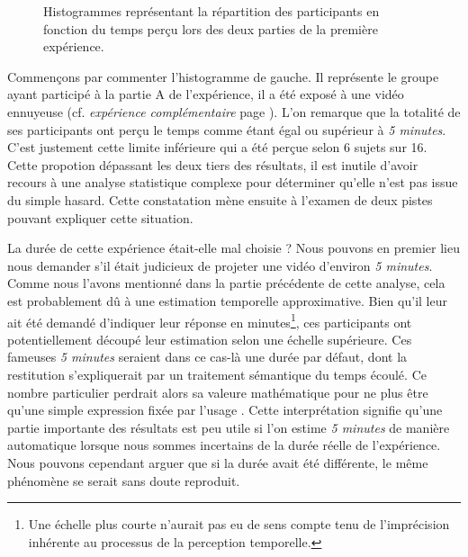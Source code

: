 \documentclass[12pt,fleqn,oneside,openany]{book} %
\begin{document}
\begin{figure}[h!]
\centering
\begin{minipage}[t]{.49\textwidth}
\end{minipage}
\hfill
\begin{minipage}[t]{.49\textwidth}
\end{minipage}
\caption{Histogrammes représentant la répartition des participants en fonction du temps perçu lors des deux parties de la première expérience.}
\end{figure}

Commençons par commenter l'histogramme de gauche. Il représente le groupe ayant participé à la partie A de l'expérience, il a été exposé à une vidéo ennuyeuse (cf. \emph{expérience complémentaire} page \pageref{ssec:exp1.2}). L'on remarque que la totalité de ses participants ont perçu le temps comme étant égal ou supérieur à \emph{5 minutes}. C'est justement cette limite inférieure qui a été perçue selon 6 sujets sur 16. Cette propotion dépassant les deux tiers des résultats, il est inutile d'avoir recours à une analyse statistique complexe pour déterminer qu'elle n'est pas issue du simple hasard. Cette constatation mène ensuite à l'examen de deux pistes pouvant expliquer cette situation.

La durée de cette expérience était-elle mal choisie ? Nous pouvons en premier lieu nous demander s'il était judicieux de projeter une vidéo d'environ \emph{5 minutes}. Comme nous l'avons mentionné dans la partie précédente de cette analyse, cela est probablement dû à une estimation temporelle approximative. Bien qu'il leur ait été demandé d'indiquer leur réponse en minutes\footnote{Une échelle plus courte n'aurait pas eu de sens compte tenu de l'imprécision inhérente au processus de la perception temporelle.}, ces participants ont potentiellement découpé leur estimation selon une échelle supérieure. Ces fameuses \emph{5 minutes} seraient dans ce cas-là une durée par défaut, dont la restitution s'expliquerait par un traitement sémantique du temps écoulé. Ce nombre particulier perdrait alors sa valeure mathématique pour ne plus être qu'une simple expression fixée par l'usage \cite{durand1970}. Cette interprétation signifie qu'une partie importante des résultats est peu utile si l'on estime \emph{5 minutes} de manière automatique lorsque nous sommes incertains de la durée réelle de l'expérience. Nous pouvons cependant arguer que si la durée avait été différente, le même phénomène se serait sans doute reproduit. 
\end{document}
